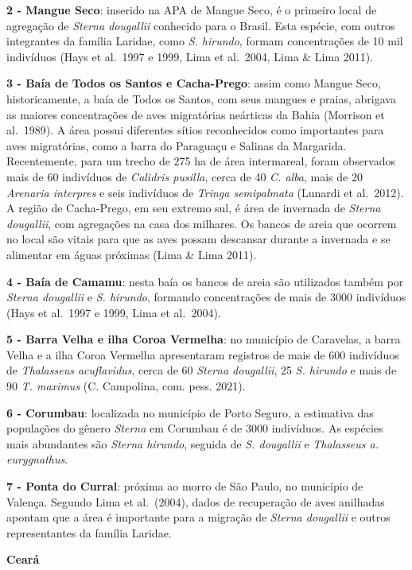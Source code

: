 \documentclass[
  oneside]{scrbook}
\begin{document}
\textbf{2 - Mangue Seco}: inserido na APA de Mangue Seco, é o primeiro local de agregação de \emph{Sterna dougallii} conhecido para o Brasil. Esta espécie, com outros integrantes da família Laridae, como \emph{S. hirundo}, formam concentrações de 10 mil indivíduos (Hays et al.~1997 e 1999, Lima et al.~2004, Lima \& Lima 2011).

\textbf{3 - Baía de Todos os Santos e Cacha-Prego}: assim como Mangue Seco, historicamente, a baía de Todos os Santos, com seus mangues e praias, abrigava as maiores concentrações de aves migratórias neárticas da Bahia (Morrison et al.~1989). A área possui diferentes sítios reconhecidos como importantes para aves migratórias, como a barra do Paraguaçu e Salinas da Margarida. Recentemente, para um trecho de 275 ha de área intermareal, foram observados mais de 60 indivíduos de \emph{Calidris pusilla}, cerca de 40 \emph{C. alba}, mais de 20 \emph{Arenaria interpres} e seis indivíduos de \emph{Tringa semipalmata} (Lunardi et al.~2012). A região de Cacha-Prego, em seu extremo sul, é área de invernada de \emph{Sterna dougallii}, com agregações na casa dos milhares. Os bancos de areia que ocorrem no local são vitais para que as aves possam descansar durante a invernada e se alimentar em águas próximas (Lima \& Lima 2011).

\textbf{4 - Baía de Camamu}: nesta baía os bancos de areia são utilizados também por \emph{Sterna dougallii} e \emph{S. hirundo}, formando concentrações de mais de 3000 indivíduos (Hays et al.~1997 e 1999, Lima et al.~2004).

\textbf{5 - Barra Velha e ilha Coroa Vermelha}: no município de Caravelas, a barra Velha e a ilha Coroa Vermelha apresentaram registros de mais de 600 indivíduos de \emph{Thalasseus acuflavidus}, cerca de 60 \emph{Sterna dougallii}, 25 \emph{S. hirundo} e mais de 90 \emph{T. maximus} (C. Campolina, com. pess. 2021).

\textbf{6 - Corumbau}: localizada no município de Porto Seguro, a estimativa das populações do gênero \emph{Sterna} em Corumbau é de 3000 indivíduos. As espécies mais abundantes são \emph{Sterna hirundo}, seguida de \emph{S. dougallii} e \emph{Thalasseus a. eurygnathus}.

\textbf{7 - Ponta do Curral}: próxima ao morro de São Paulo, no município de Valença. Segundo Lima et al.~(2004), dados de recuperação de aves anilhadas apontam que a área é importante para a migração de \emph{Sterna dougallii} e outros representantes da família Laridae.

\textbf{Ceará}
\end{document}
